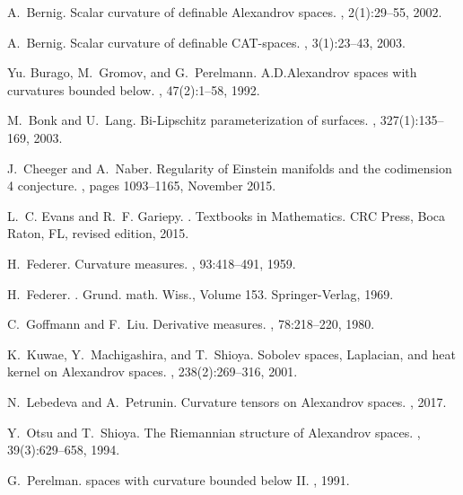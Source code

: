 \documentclass[12pt,leqno,intlimits]{amsart}
\numberwithin{equation}{section}
\theoremstyle{definition}
\theoremstyle{remark}
\begin{document}
\begin{thebibliography}{KMS01}
A.~Bernig.
\newblock Scalar curvature of definable {A}lexandrov spaces.
, 2(1):29--55, 2002.

A.~Bernig.
\newblock Scalar curvature of definable {CAT}-spaces.
, 3(1):23--43, 2003.

Yu. Burago, M.~Gromov, and G.~Perelmann.
\newblock A.{D}.{Alexandrov} spaces with curvatures bounded below.
, 47(2):1--58, 1992.

M.~Bonk and U.~Lang.
\newblock Bi-Lipschitz parameterization of surfaces.
, 327(1):135--169, 2003.

J.~Cheeger and A.~Naber.
\newblock Regularity of {Einstein} manifolds and the codimension 4 conjecture.
, pages 1093--1165, November 2015.

L.~C. Evans and R.~F. Gariepy.
.
\newblock Textbooks in Mathematics. CRC Press, Boca Raton, FL, revised edition,
2015.

H.~Federer.
\newblock Curvature measures.
, 93:418--491, 1959.

H.~Federer.
.
\newblock Grund. math. Wiss., Volume 153. Springer-Verlag, 1969.

C.~Goffmann and F.~Liu.
\newblock Derivative measures.
, 78:218--220, 1980.

K.~Kuwae, Y.~Machigashira, and T.~Shioya.
\newblock Sobolev spaces, {L}aplacian, and heat kernel on {A}lexandrov spaces.
, 238(2):269--316, 2001.

N.~Lebedeva and A.~Petrunin.
\newblock Curvature tensors on {Alexandrov} spaces.
, 2017.

Y.~Otsu and T.~Shioya.
\newblock The {R}iemannian structure of {A}lexandrov spaces.
, 39(3):629--658, 1994.

G.~Perelman.
 spaces with curvature bounded below {II}.
, 1991.


\end{thebibliography}
\end{document}
